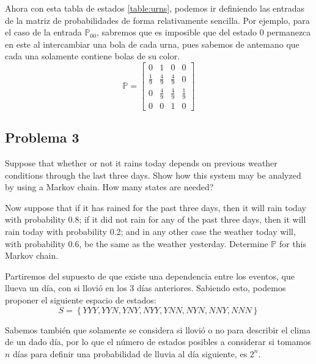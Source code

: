 \documentclass{article}
\begin{document}
            Ahora con esta tabla de estados \ref{table:urns}, podemos ir definiendo las entradas de la matriz de probabilidades de forma relativamente sencilla. Por ejemplo, para el caso de la entrada $\mathbb{P}_{00}$, sabremos que es imposible que del estado 0 permanezca en este al intercambiar una bola de cada urna, pues sabemos de antemano que cada una solamente contiene bolas de su color.
            \begin{equation}
                \mathbb{P} = \begin{bmatrix}
                    0 & 1 & 0 & 0 \\[2pt]
                    \frac{1}{9} & \frac{4}{9} & \frac{4}{9} & 0 \\[2pt]
                    0 & \frac{4}{9} & \frac{4}{9} & \frac{1}{9} \\[2pt]
                    0 & 0 & 1 & 0 
                \end{bmatrix}
            \end{equation}

        \subsection*{Problema 3}

            Suppose that whether or not it rains today depends on previous weather conditions through the last three days. Show how this system may be analyzed by using a Markov chain. How many states are needed?

            Now suppose that if it has rained for the past three days, then it will rain today with probability 0.8; if it did not rain for any of the past three days, then it will rain today with probability 0.2; and in any other case the weather today will, with probability 0.6, be the same as the weather yesterday. Determine $\mathbb{P}$ for this Markov chain.

            Partiremos del supuesto de que existe una dependencia entre los eventos, que llueva un día, con si llovió en los 3 días anteriores. Sabiendo esto, podemos proponer el siguiente espacio de estados:
            \begin{equation}
                S = \left\{YYY, YYN, YNY, NYY, YNN, NYN, NNY, NNN\right\}
            \end{equation}

            Sabemos también que solamente se considera si llovió o no para describir el clima de un dado día, por lo que el número de estados posibles a considerar si tomamos $n$ días para definir una probabilidad de lluvia al día siguiente, es $2^{n}$.
\end{document}
